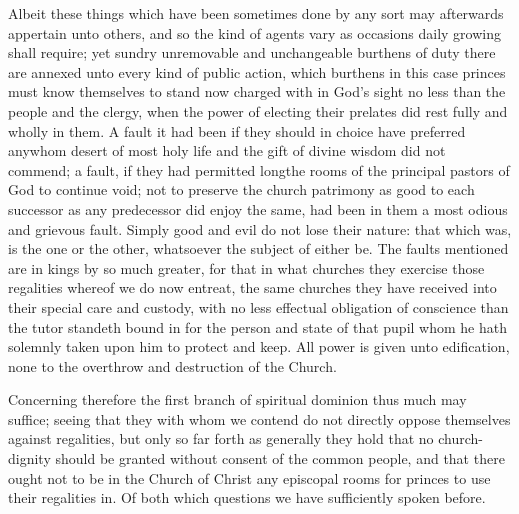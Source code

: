 Albeit these things which have been sometimes done by any sort may afterwards appertain unto others, and so the kind of agents vary as occasions daily growing shall require; yet sundry unremovable and unchangeable burthens of duty there are annexed unto every kind of public action, which burthens in this case princes must know themselves to stand now charged with in God’s sight no less than the people and the clergy, when the power of electing their prelates did rest fully and wholly in them. A fault it had been if they should in choice have preferred anywhom desert of most holy life and the gift of divine wisdom did not commend; a fault, if they had permitted longthe rooms of the principal pastors of God to continue void; not to preserve the church patrimony as good to each successor as any predecessor did enjoy the same, had been in them a most odious and grievous fault. Simply good and evil do not lose their nature: that which was, is the one or the other, whatsoever the subject of either be. The faults mentioned are in kings by so much greater, for that in what churches they exercise those regalities whereof we do now entreat, the same churches they have received into their special care and custody, with no less effectual obligation of conscience than the tutor standeth bound in for the person and state of that pupil whom he hath solemnly taken upon him to protect and keep. All power is given unto edification, none to the overthrow and destruction of the Church.

Concerning therefore the first branch of spiritual dominion  thus much may suffice; seeing that they with whom we contend do not directly oppose themselves against regalities, but only so far forth as generally they hold that no church-dignity should be granted without consent of the common people, and that there ought not to be in the Church of Christ any episcopal rooms for princes to use their regalities in. Of both which questions we have sufficiently spoken before.

